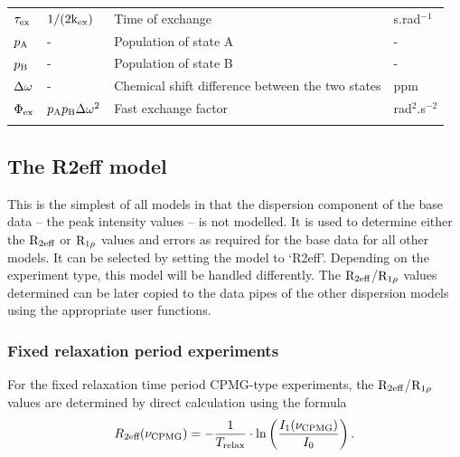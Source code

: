 \begin{table}
\begin{center}
\begin{tabular}{llll}
$\tau_\textrm{ex}$                  & $1 / (2 \textrm{k}_\textrm{ex})$        & Time of exchange                                                              & s.rad$^{-1}$ \\
$p_\textrm{A}$                   & -                     & Population of state A                                                         & - \\
$p_\textrm{B}$                   & -                     & Population of state B                                                         & - \\
$\Delta\omega$                   & -                     & Chemical shift difference between the two states                              & ppm \\
$\Phi_\textrm{ex}$                & $p_\textrm{A}p_\textrm{B}\Delta\omega^2$         & Fast exchange factor                                                          & rad$^2$.s$^{-2}$ \\
\bottomrule
\label{table: dispersion parameters}
\end{tabular}
\end{center}
\end{table}




\subsection{The R2eff model}

This is the simplest of all models in that the dispersion component of the base data -- the peak intensity values -- is not modelled.  It is used to determine either the $\mathrm{R}_{2\textrm{eff}}$ or $\mathrm{R}_{1\rho}$ values and errors as required for the base data for all other models.  It can be selected by setting the model to `R2eff'.  Depending on the experiment type, this model will be handled differently.  The $\mathrm{R}_{2\textrm{eff}}$/$\mathrm{R}_{1\rho}$ values determined can be later copied to the data pipes of the other dispersion models using the appropriate user functions.


\subsubsection{Fixed relaxation period experiments}

For the fixed relaxation time period CPMG-type experiments, the $\mathrm{R}_{2\textrm{eff}}$/$\mathrm{R}_{1\rho}$ values are determined by direct calculation using the formula
\begin{equation}
    R_{2\textrm{eff}}(\nu_\textrm{CPMG}) = - \frac{1}{T_\textrm{relax}} \cdot \ln \left( \frac{I_1(\nu_\textrm{CPMG})}{I_0} \right) .
\end{equation}

